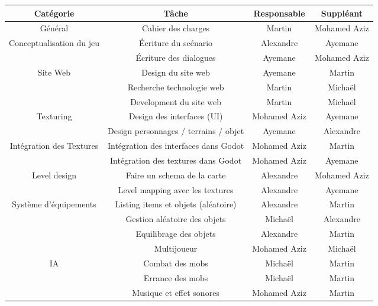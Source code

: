 \begin{small}
    
    \begin{figure}[H]
        \centering
        \begin{tabular}{|c|c|c|c|}
            \hline
        \bfseries{Cat\'egorie} & \bfseries{T\^ache} & \bfseries{Responsable} & \bfseries{Suppl\'eant} \\
        \hline\hline
        G\'en\'eral & Cahier des charges & Martin & Mohamed Aziz \\
        \hline\hline
        \multirow{2}{*}{Conceptualisation du jeu} & \'Ecriture du sc\'enario & Alexandre & Ayemane \\
        \cline{2-4}
        & \'Ecriture des dialogues & Ayemane  & Mohamed Aziz \\
        \hline\hline
        \multirow{3}{*}{Site Web} & Design du site web & Ayemane & Martin \\
        \cline{2-4}
        & Recherche technologie web & Martin & Michaël \\
        \cline{2-4}
        & Development du site web & Martin & Michaël \\
        \hline\hline
        \multirow{2}{*}{Texturing} & Design des interfaces (UI) & Mohamed Aziz & Ayemane \\
        \cline{2-4}
        & Design personnages / terrains / objet & Ayemane & Alexandre \\
        \hline\hline
        \multirow{2}{*}{Intégration des Textures} & Int\'egration des interfaces dans Godot & Mohamed Aziz & Martin \\
        \cline{2-4}
        & Int\'egration des textures dans Godot & Mohamed Aziz & Ayemane \\
        \hline\hline
        \multirow{2}{*}{Level design} & Faire un schema de la carte & Alexandre & Mohamed Aziz \\
        \cline{2-4}
        &Level mapping avec les textures & Alexandre & Ayemane \\
        \hline\hline
        \multirow{3}{*}{Système d'équipements} & Listing items et objets (al\'eatoire) & Alexandre & Martin \\
        \cline{2-4}
        & Gestion aléatoire des objets & Michaël & Alexandre \\
        \cline{2-4}
        & Equilibrage des objets & Alexandre & Martin \\
        \hline\hline
        & Multijoueur & Mohamed Aziz & Michaël \\
        \hline\hline
        \multirow{2}{*}{IA} & Combat des mobs & Michaël & Martin \\
        \cline{2-4}
        & Errance des mobs & Michaël & Martin \\
        \hline\hline
        & Musique et effet sonores & Mohamed Aziz & Martin \\
        \hline


\end{tabular}
\end{figure}
\end{small}
